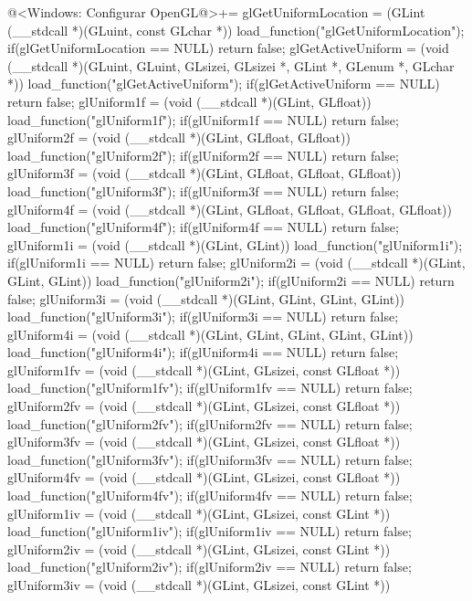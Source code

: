 \iniciocodigo
@<Windows: Configurar OpenGL@>+=
glGetUniformLocation = (GLint (__stdcall *)(GLuint, const GLchar *))
                            load_function("glGetUniformLocation");
if(glGetUniformLocation == NULL) return false;
glGetActiveUniform = (void (__stdcall *)(GLuint, GLuint, GLsizei, GLsizei *,
                                         GLint *, GLenum *, GLchar *))
                     load_function("glGetActiveUniform");
if(glGetActiveUniform == NULL) return false;
glUniform1f = (void (__stdcall *)(GLint, GLfloat)) load_function("glUniform1f");
if(glUniform1f == NULL) return false;
glUniform2f = (void (__stdcall *)(GLint, GLfloat, GLfloat))
               load_function("glUniform2f");
if(glUniform2f == NULL) return false;
glUniform3f = (void (__stdcall *)(GLint, GLfloat, GLfloat, GLfloat))
                        load_function("glUniform3f");
if(glUniform3f == NULL) return false;
glUniform4f = (void (__stdcall *)(GLint, GLfloat, GLfloat, GLfloat, GLfloat))
                        load_function("glUniform4f");
if(glUniform4f == NULL) return false;
glUniform1i = (void (__stdcall *)(GLint, GLint)) load_function("glUniform1i");
if(glUniform1i == NULL) return false;
glUniform2i = (void (__stdcall *)(GLint, GLint, GLint)) load_function("glUniform2i");
if(glUniform2i == NULL) return false;
glUniform3i = (void (__stdcall *)(GLint, GLint, GLint, GLint))
               load_function("glUniform3i");
if(glUniform3i == NULL) return false;
glUniform4i = (void (__stdcall *)(GLint, GLint, GLint, GLint, GLint))
                 load_function("glUniform4i");
if(glUniform4i == NULL) return false;
glUniform1fv = (void (__stdcall *)(GLint, GLsizei, const GLfloat *))
                 load_function("glUniform1fv");
if(glUniform1fv == NULL) return false;
glUniform2fv = (void (__stdcall *)(GLint, GLsizei, const GLfloat *))
                 load_function("glUniform2fv");
if(glUniform2fv == NULL) return false;
glUniform3fv = (void (__stdcall *)(GLint, GLsizei, const GLfloat *))
                 load_function("glUniform3fv");
if(glUniform3fv == NULL) return false;
glUniform4fv = (void (__stdcall *)(GLint, GLsizei, const GLfloat *))
                 load_function("glUniform4fv");
if(glUniform4fv == NULL) return false;
glUniform1iv = (void (__stdcall *)(GLint, GLsizei, const GLint *))
                 load_function("glUniform1iv");
if(glUniform1iv == NULL) return false;
glUniform2iv = (void (__stdcall *)(GLint, GLsizei, const GLint *))
                 load_function("glUniform2iv");
if(glUniform2iv == NULL) return false;
glUniform3iv = (void (__stdcall *)(GLint, GLsizei, const GLint *))
